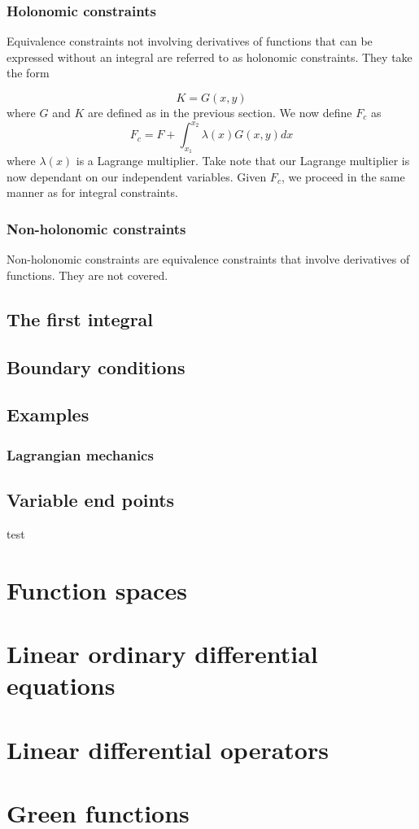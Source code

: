 \documentclass[]{article}
\begin{document}
\subsubsection{Holonomic constraints}
Equivalence constraints not involving derivatives of functions that can be expressed without an integral are referred to as holonomic constraints. They take the form

\begin{equation} K = G(x,y) \end{equation}
where $G$ and $K$ are defined as in the previous section. We now define $F_{c}$ as
\begin{equation} F_{c} = F + \int_{x_{1}}^{x_{2}} \lambda (x) G(x,y)dx \end{equation}
where $\lambda (x)$ is a Lagrange multiplier. Take note that our Lagrange multiplier is now dependant on our independent variables. Given $F_{c}$, we proceed in the same manner as for integral constraints.
\subsubsection{Non-holonomic constraints}
Non-holonomic constraints are equivalence constraints that involve derivatives of functions. They are not covered.
\subsection{The first integral}
\subsection{Boundary conditions}
\subsection{Examples}
\subsubsection{Lagrangian mechanics}
\subsection{Variable end points}
test
\nocite{*}




\section{Function spaces}

\section{Linear ordinary differential equations}

\section{Linear differential operators}

\section{Green functions}
\end{document}

